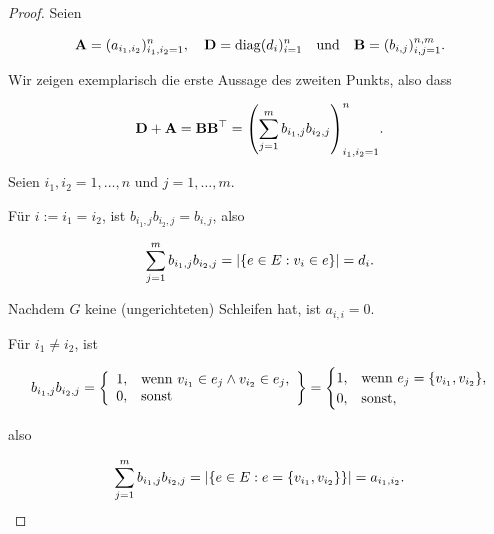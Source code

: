         \begin{proof}

            Seien

            \begin{align*}
                \mathbf A = (a_{i_1, i_2})_{i_1, i_2 = 1}^n,
                \quad
                \mathbf D = \operatorname{diag}(d_i)_{i=1}^n
                \quad
                \text{und}
                \quad
                \mathbf B = (b_{i,j})_{i,j=1}^{n,m}.
            \end{align*}

            Wir zeigen exemplarisch die erste Aussage des zweiten Punkts, also dass

            \begin{align*}
                \mathbf D + \mathbf A
                =
                \mathbf B \mathbf B^\top
                =
                {\left ( 
                    \sum_{j=1}^m
                        b_{i_1, j} b_{i_2, j}
                 \right )}_{i_1, i_2 = 1}^n.
            \end{align*}

            Seien $i_1, i_2 = 1, \dots, n$ und $j = 1, \dots, m$.

            Für $i := i_1 = i_2$, ist $b_{i_1, j} b_{i_2, j} = b_{i,j}$, also

            \begin{align*}
                \sum_{j=1}^m
                    b_{i_1, j} b_{i_2, j}
                =
                |{\left \{ e \in E: v_i \in e \right \}}|
                =
                d_i.
            \end{align*}

            Nachdem $G$ keine (ungerichteten) Schleifen hat, ist $a_{i,i} = 0$.

            Für $i_1 \neq i_2$, ist

            \begin{align*}
                b_{i_1,j} b_{i_2, j}
                =
                {\left \{ 
                    \begin{array}{ll}
                        1, & \text{wenn} ~ v_{i_1} \in e_j \land v_{i_2} \in e_j, \\
                        0, & \text{sonst}
                    \end{array}
                 \right \}}
                =
                \begin{cases}
                    1, & \text{wenn} ~ e_j = {\left \{ v_{i_1}, v_{i_2} \right \}}, \\
                    0, & \text{sonst},
                \end{cases}
            \end{align*}

            also

            \begin{align*}
                \sum_{j=1}^m
                    b_{i_1, j} b_{i_2, j}
                =
                |{\left \{ e \in E: e = {\left \{ v_{i_1}, v_{i_2} \right \}} \right \}}|
                =
                a_{i_1, i_2}.
            \end{align*}

        \end{proof}

